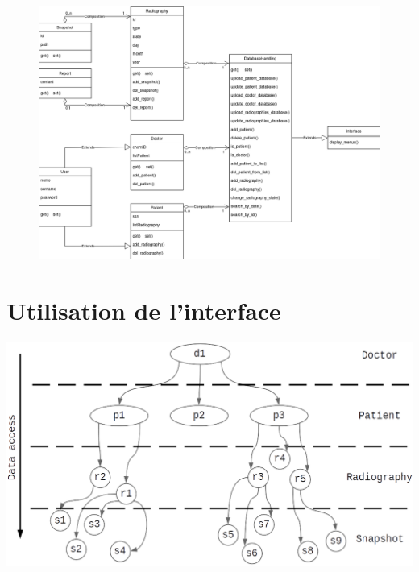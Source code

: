 \documentclass[12pt,a4paper]{article}
\newenvironment{Figure}
{\par\medskip\noindent\minipage{\linewidth}}
{\endminipage\par\medskip}
\begin{document}
	\begin{figure}[H]
		\centering
		\includegraphics[width=0.8\linewidth]{images/UML_OOP.png}
		\label{fig:UML}
	\end{figure}

	\pagebreak





		
		\section{Utilisation de l'interface}
		
		\begin{Figure}
			\centering
			\includegraphics[width=0.7\linewidth]{images/structure.png}
			\label{fig:structure}
		\end{Figure}
	
	\pagebreak
	
\end{document}

